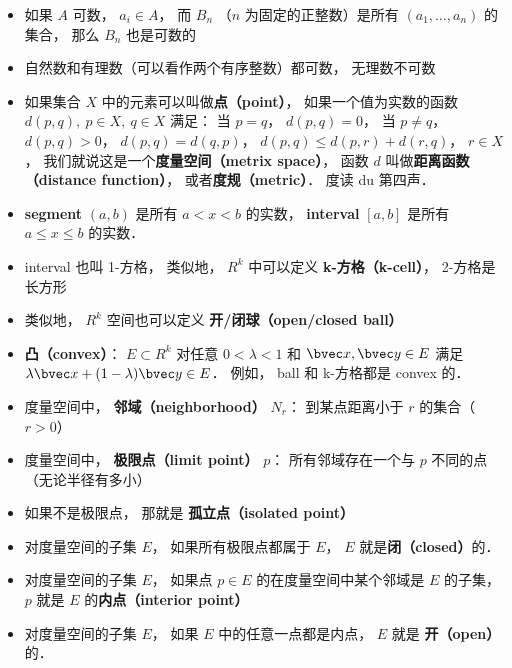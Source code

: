 \begin{itemize}
\item 如果 $A$ 可数， $a_i \in A$，  而 $B_n$ （$n$ 为固定的正整数）是所有 $(a_1, \dots, a_n)$ 的集合， 那么 $B_n$ 也是可数的

\item 自然数和有理数（可以看作两个有序整数）都可数， 无理数不可数

\item 如果集合 $X$ 中的元素可以叫做\textbf{点（point）}， 如果一个值为实数的函数 $d(p, q), \ p \in X,\ q \in X$ 满足： 当 $p = q$， $d(p, q) = 0$， 当 $p \ne q$， $d(p, q) > 0$， $d(p, q) = d(q, p)$， $d(p, q) \leqslant d(p, r) + d(r, q)$， $r \in X$， 我们就说这是一个\textbf{度量空间（metrix space）}， 函数 $d$ 叫做\textbf{距离函数（distance function）}， 或者\textbf{度规（metric）}． 度读 du 第四声．

\item \textbf{segment} $(a, b)$ 是所有 $a < x < b$ 的实数， \textbf{interval} $[a, b]$ 是所有 $a \leqslant x \leqslant b$ 的实数．

\item interval 也叫 1-方格， 类似地， $R^k$ 中可以定义 \textbf{k-方格（k-cell）}， 2-方格是长方形

\item 类似地， $R^k$ 空间也可以定义 \textbf{开/闭球（open/closed ball）}

\item \textbf{凸（convex）}： $E \subset R^k$ 对任意 $0 < \lambda < 1$ 和 $\bvec x, \bvec y \in E$ 满足 $\lambda \bvec x + (1 - \lambda) \bvec y \in E$． 例如， ball 和 k-方格都是 convex 的．

\item 度量空间中， \textbf{邻域（neighborhood）} $N_r$： 到某点距离小于 $r$ 的集合（$r > 0$）

\item 度量空间中， \textbf{极限点（limit point）} $p$： 所有邻域存在一个与 $p$ 不同的点（无论半径有多小）

\item 如果不是极限点， 那就是 \textbf{孤立点（isolated point）}

\item 对度量空间的子集 $E$， 如果所有极限点都属于 $E$， $E$ 就是\textbf{闭（closed）}的．

\item 对度量空间的子集 $E$， 如果点 $p \in E$ 的在度量空间中某个邻域是 $E$ 的子集， $p$ 就是 $E$ 的\textbf{内点（interior point）}

\item 对度量空间的子集 $E$， 如果 $E$ 中的任意一点都是内点， $E$ 就是 \textbf{开（open）} 的．


\end{itemize}
